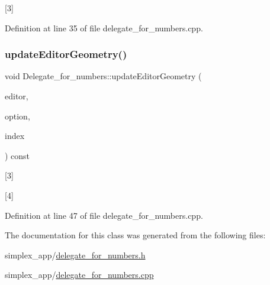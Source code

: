 \mbox{[}3\mbox{]} 

Definition at line 35 of file delegate\+\_\+for\+\_\+numbers.\+cpp.

\mbox{\label{classDelegate__for__numbers_aa8c3d2a65f804ee47df6b938f834c9ca}} 
\subsubsection{\texorpdfstring{update\+Editor\+Geometry()}{updateEditorGeometry()}}
{\footnotesize\ttfamily void Delegate\+\_\+for\+\_\+numbers\+::update\+Editor\+Geometry (\begin{DoxyParamCaption}\item[{Q\+Widget $\ast$}]{editor,  }\item[{const Q\+Style\+Option\+View\+Item \&}]{option,  }\item[{const Q\+Model\+Index \&}]{index }\end{DoxyParamCaption}) const}



\mbox{[}3\mbox{]} 

\mbox{[}4\mbox{]} 

Definition at line 47 of file delegate\+\_\+for\+\_\+numbers.\+cpp.



The documentation for this class was generated from the following files\+:\begin{DoxyCompactItemize}
\item 
simplex\+\_\+app/\hyperlink{delegate__for__numbers_8h}{delegate\+\_\+for\+\_\+numbers.\+h}\item 
simplex\+\_\+app/\hyperlink{delegate__for__numbers_8cpp}{delegate\+\_\+for\+\_\+numbers.\+cpp}\end{DoxyCompactItemize}

